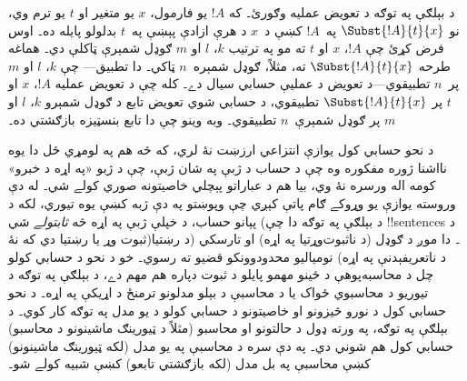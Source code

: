 \documentclass[../../../include/open-logic-section]{subfiles}
\begin{document}
د بېلګې په توګه د تعويض عمليه وګورئ۔ که $!A$ يو فارمول، $x$ يو
متغير او $t$ يو ترم وي، نو $\Subst{!A}{t}{x}$ په~$!A$ کښې د~$x$ د
هرې ازادې پېښې په~$t$ بدلولو پايله ده۔ اوس فرض کړئ چې $!A$، $x$ او
$t$ ته مو په ترتيب $k$، $l$ او $m$ ګوډل شمېرې ټاکلې دي۔ هماغه
طرحه $\Subst{!A}{t}{x}$ ته، مثلاً، ګوډل شمېره~$n$ ټاکي۔ دا تطبيق---
چې $k$، $l$ او $m$ پر~$n$ تطبيقوي---د تعويض د عمليې حسابي سيال دے۔
کله چې د تعويض عمليه $!A$، $x$ او $t$ پر
$\Subst{!A}{t}{x}$ تطبيقوي، د حسابي شوي تعويض تابع د ګوډل شمېرو
$k$، $l$ او $m$ پر ګوډل شمېرې~$n$ تطبيقوي۔ وبه وينو چې دا تابع
بنسټيزه بازګشتي ده۔

د نحو حسابي کول يوازې انتزاعي ارزښت نۀ لري، که څه هم په لومړي ځل دا
يوه نااشنا ژوره مفکوره وه چې د حساب د ژبې په شان ژبې، چې د ژبو «په
اړه د خبرو» کومه اله ورسره نۀ وي، بيا هم د عباراتو پېچلي خاصيتونه
صوري کولے شي۔ له دې وروسته يوازې يو وړوکے ګام پاتې کېږي چې وپوښتو په
دې ژبه کښې يوه تيوري، لکه د پېانو حساب، د خپلې ژبې په اړه څه
\emph{ثابتولے} شي (د بېلګې په توګه دا چې !!{sentence}s د ثبوت وړ يا
رښتيا دي که نۀ)۔ دا موږ د ګوډل (د ناثبوت‌وړتيا په اړه) او تارسکي (د
رښتيا د ناتعريفېدنې په اړه) نومياليو محدودوونکو قضيو ته رسوي۔ خو د
نحو د حسابي کولو چل د محاسبه‌پوهې د ځينو مهمو پايلو د ثبوت دپاره هم
مهم دے، د بېلګې په توګه د تيوريو د محاسبوي ځواک يا د محاسبې د بېلو
مدلونو ترمنځ د اړيکې په اړه۔ د نحو حسابي کول د نورو څيزونو او
خاصيتونو د حسابي کولو د يو مدل په توګه کار کوي۔ د بېلګې په توګه، په
ورته ډول د حالتونو او محاسبو (مثلاً د ټيورينګ ماشينونو د محاسبو)
حسابي کول هم شوني دي۔ په دې سره د محاسبې په يو مدل (لکه ټيورينګ
ماشينونو) کښې محاسبې په بل مدل (لکه بازګشتي تابعو) کښې شبيه کولے شو۔
\end{document}
